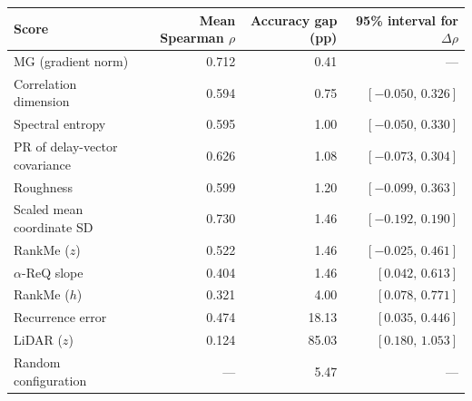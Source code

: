 \begin{tabular}{lrrr}
\toprule
Score & Mean Spearman $\rho$ & Accuracy gap (pp) & 95\% interval for $\Delta\rho$ \\
\midrule
MG (gradient norm) & 0.712 & 0.41 & --- \\
Correlation dimension & 0.594 & 0.75 & $[-0.050,\,0.326]$ \\
Spectral entropy & 0.595 & 1.00 & $[-0.050,\,0.330]$ \\
PR of delay-vector covariance & 0.626 & 1.08 & $[-0.073,\,0.304]$ \\
Roughness & 0.599 & 1.20 & $[-0.099,\,0.363]$ \\
Scaled mean coordinate SD & 0.730 & 1.46 & $[-0.192,\,0.190]$ \\
RankMe ($z$) & 0.522 & 1.46 & $[-0.025,\,0.461]$ \\
$\alpha$-ReQ slope & 0.404 & 1.46 & $[0.042,\,0.613]$ \\
RankMe ($h$) & 0.321 & 4.00 & $[0.078,\,0.771]$ \\
Recurrence error & 0.474 & 18.13 & $[0.035,\,0.446]$ \\
LiDAR ($z$) & 0.124 & 85.03 & $[0.180,\,1.053]$ \\
\addlinespace
Random configuration & --- & 5.47 & --- \\
\bottomrule
\end{tabular}
